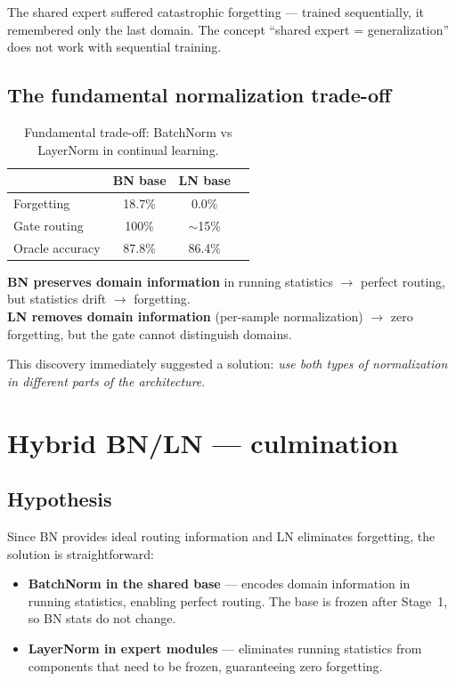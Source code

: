\documentclass[11pt,a4paper]{report}
\begin{document}
The shared expert suffered catastrophic forgetting --- trained sequentially, it remembered only the last domain. The concept ``shared expert = generalization'' does not work with sequential training.

\subsection{The fundamental normalization trade-off}

\begin{table}[h]
\centering
\caption{Fundamental trade-off: BatchNorm vs LayerNorm in continual learning.}
\begin{tabular}{l c c c}
\hline
& \textbf{BN base} & \textbf{LN base} \\
\hline
Forgetting & 18.7\% & 0.0\% \\
Gate routing & 100\% & $\sim$15\% \\
Oracle accuracy & 87.8\% & 86.4\% \\
\hline
\end{tabular}
\end{table}

\textbf{BN preserves domain information} in running statistics $\to$ perfect routing, but statistics drift $\to$ forgetting.\\
\textbf{LN removes domain information} (per-sample normalization) $\to$ zero forgetting, but the gate cannot distinguish domains.

This discovery immediately suggested a solution: \emph{use both types of normalization in different parts of the architecture}.



\section{Hybrid BN/LN --- culmination}
\label{sec:hybrid_bn_ln}

\subsection{Hypothesis}

Since BN provides ideal routing information and LN eliminates forgetting, the solution is straightforward:
\begin{itemize}
    \item \textbf{BatchNorm in the shared base} --- encodes domain information in running statistics, enabling perfect routing. The base is frozen after Stage~1, so BN stats do not change.
    \item \textbf{LayerNorm in expert modules} --- eliminates running statistics from components that need to be frozen, guaranteeing zero forgetting.
\end{itemize}
\end{document}
